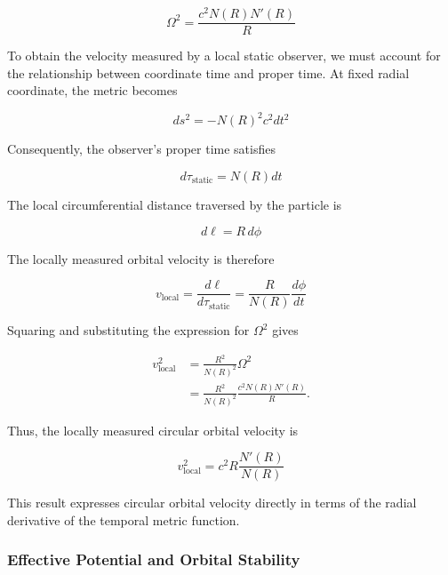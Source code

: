 \documentclass[pdflatex,sn-mathphys-num]{sn-jnl}%
\theoremstyle{thmstyleone}%
\theoremstyle{thmstyletwo}%
\theoremstyle{thmstylethree}%
\begin{document}
\begin{appendices}
\begin{equation}
\boxed{
\Omega^2
=
\frac{c^2N(R)N'(R)}{R}
}
\end{equation}

To obtain the velocity measured by a local static observer, we must account for the relationship between coordinate time and proper time. At fixed radial coordinate, the metric becomes

\begin{equation}
ds^2=-N(R)^2c^2dt^2
\end{equation}

Consequently, the observer's proper time satisfies

\begin{equation}
d\tau_{\mathrm{static}}=N(R)dt
\end{equation}

The local circumferential distance traversed by the particle is

\begin{equation}
d\ell=R\,d\phi
\end{equation}

The locally measured orbital velocity is therefore

\begin{equation}
v_{\mathrm{local}}
=
\frac{d\ell}{d\tau_{\mathrm{static}}}
=
\frac{R}{N(R)}\frac{d\phi}{dt}
\end{equation}

Squaring and substituting the expression for $\Omega^2$ gives

\begin{align}
v_{\mathrm{local}}^2
&=
\frac{R^2}{N(R)^2}\Omega^2 \\
&=
\frac{R^2}{N(R)^2}
\frac{c^2N(R)N'(R)}{R}.
\end{align}

Thus, the locally measured circular orbital velocity is

\begin{equation}
\boxed{
v_{\mathrm{local}}^2
=
c^2R\frac{N'(R)}{N(R)}
}
\end{equation}

This result expresses circular orbital velocity directly in terms of the radial derivative of the temporal metric function.

\subsubsection{Effective Potential and Orbital Stability}


\end{appendices}
\end{document}
